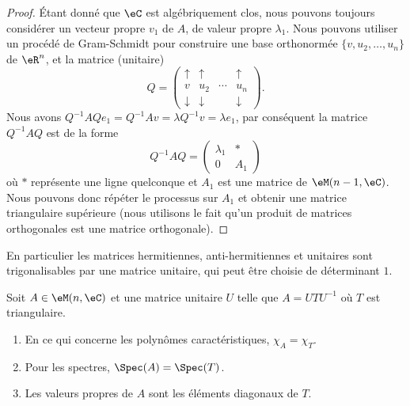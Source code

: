 \begin{proof}
    Étant donné que \( \eC\) est algébriquement clos, nous pouvons toujours considérer un vecteur propre \( v_1\) de \( A\), de valeur propre \( \lambda_1\). Nous pouvons utiliser un procédé de Gram-Schmidt pour construire une base orthonormée \( \{ v,u_2,\ldots, u_n \}\) de \( \eR^n\), et la matrice (unitaire)
    \begin{equation}
        Q=\begin{pmatrix}
             \uparrow   &   \uparrow    &       &   \uparrow    \\
             v   &   u_2    &   \cdots    &   u_n    \\
             \downarrow   &   \downarrow    &       &   \downarrow
         \end{pmatrix}.
    \end{equation}
    Nous avons \( Q^{-1}AQe_1=Q^{-1} Av=\lambda Q^{-1} v=\lambda e_1\), par conséquent la matrice \( Q^{-1} AQ\) est de la forme
    \begin{equation}
        Q^{-1}AQ=\begin{pmatrix}
            \lambda_1    &   *    \\
            0    &   A_1
        \end{pmatrix}
    \end{equation}
    où \( *\) représente une ligne quelconque et \( A_1\) est une matrice de \( \eM(n-1,\eC)\). Nous pouvons donc répéter le processus sur \( A_1\) et obtenir une matrice triangulaire supérieure (nous utilisons le fait qu'un produit de matrices orthogonales est une matrice orthogonale).
\end{proof}
En particulier les matrices hermitiennes, anti-hermitiennes et unitaires sont trigonalisables par une matrice unitaire, qui peut être choisie de déterminant \( 1\).

\begin{lemma}       \label{LEMooRCFGooPPXiKi}
    Soit \( A\in \eM(n,\eC)\) et une matrice unitaire \( U\) telle que \( A=UTU^{-1}\) où \( T\) est triangulaire.
    \begin{enumerate}
        \item
            En ce qui concerne les polynômes caractéristiques, \( \chi_A=\chi_T\).
        \item
            Pour les spectres, \( \Spec(A)=\Spec(T)\).
        \item
            Les valeurs propres de \( A\) sont les éléments diagonaux de \( T\).
    \end{enumerate}
\end{lemma}


